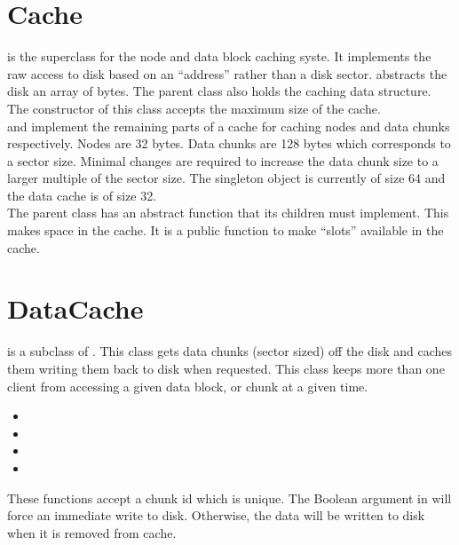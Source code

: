 \section{Cache}
\label{xref:cacheFS}
   is the superclass for the node and data block caching syste.
  It implements the raw access to disk based on an ``address'' rather than a disk sector.
   abstracts the disk an array of bytes. The parent class  also
  holds the caching data structure. The constructor of this class accepts
  the maximum size of the cache.\\
   and  implement the 
  remaining parts of a cache for caching nodes and data chunks respectively.
  Nodes are 32 bytes.  Data chunks are 128 bytes which corresponds to a sector size.
  Minimal changes are required to increase the data chunk size to a larger multiple
  of the sector size. The singleton  object is currently
  of size 64 and the data cache is of size 32.\\

  The parent class  has an abstract function that its children
  must implement.  This makes space in the cache.  It is a public 
  function to make  ``slots'' available in the cache.\\

\section{DataCache}
\label{xref:datacacheFS}
   is a subclass of .  This class gets
  data chunks (sector sized) off the disk and caches them writing them
  back to disk when requested. This class keeps more than one client
  from accessing a given data block, or chunk at a given time.

  \begin{itemize}
      \item	{}
      \item     {}
      \item     {}
      \item	{}
  \end{itemize}

  These functions accept a chunk id which is unique.  The
  Boolean argument  in  will force an 
  immediate write to disk.  Otherwise, the data will be written to 
  disk when it is removed from cache.

